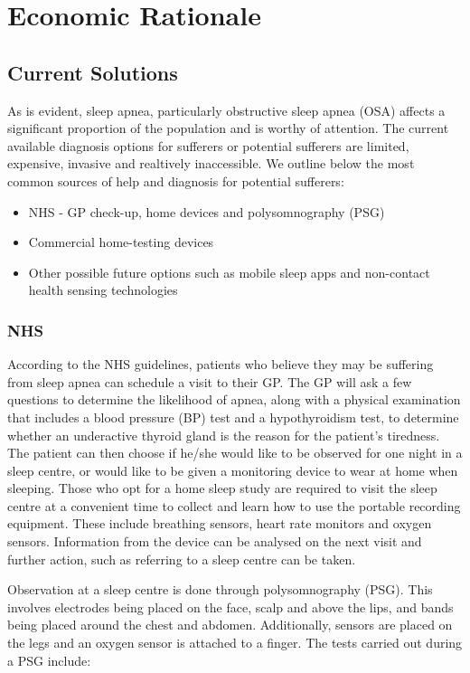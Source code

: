 \section{Economic Rationale}

\subsection{Current Solutions}

	As is evident, sleep apnea, particularly obstructive sleep apnea (OSA)
affects a significant proportion of the population and is worthy of
attention. The current available diagnosis options for sufferers or
potential sufferers are limited, expensive, invasive and realtively
inaccessible. We outline below the most common sources of help and
diagnosis for potential sufferers:
	\begin{itemize}
	\item NHS - GP check-up, home devices and polysomnography (PSG)
	\item Commercial home-testing devices
	\item Other possible future options such as mobile sleep apps and non-contact
health sensing technologies
	\end{itemize}

\subsubsection{NHS}

According to the NHS guidelines, patients who believe they may be suffering from sleep apnea can schedule a visit to their GP. The GP will ask a few questions to determine the likelihood of apnea, along with a physical examination that includes a blood pressure (BP) test and a hypothyroidism test, to determine whether an underactive thyroid gland is the reason for the patient's tiredness. The patient can then choose if he/she would like to be observed for one night in a sleep
centre, or would like to be given a monitoring device to wear at home when sleeping. Those who opt for a home sleep study are required to visit the sleep centre at a convenient time to collect and learn how to use the portable recording equipment. These include breathing sensors, heart rate monitors and oxygen sensors. Information from the device can be analysed on the next visit and further action, such as referring to a sleep centre can be taken.

Observation at a sleep centre is done through polysomnography (PSG). This involves electrodes being placed on the face, scalp and above the lips, and bands being placed around the chest and abdomen. Additionally, sensors are placed on the legs and an oxygen sensor is attached to a finger. The tests carried out during a PSG include:

